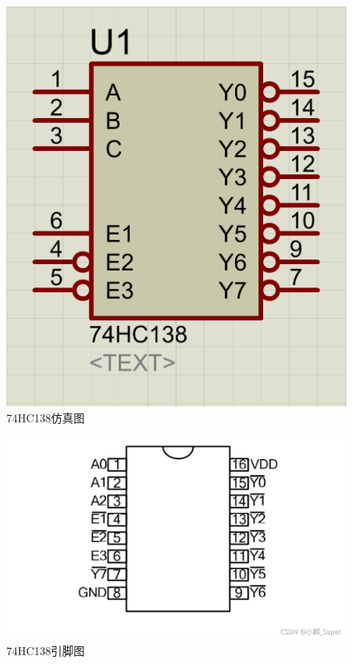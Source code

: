 \documentclass{textreportclass}  %
\begin{document}
	\begin{figure}[htbp]
		\centering
		\includegraphics[scale=0.3]{Fig/74HC138.png}
		\caption{74HC138仿真图}\label{Fig.16}
	\end{figure}
	
	\begin{figure}[htbp]
		\centering
		\includegraphics[scale=0.3]{Fig/74HC138(2).png}
		\caption{74HC138引脚图}\label{Fig.14}
	\end{figure}
	
\end{document}
